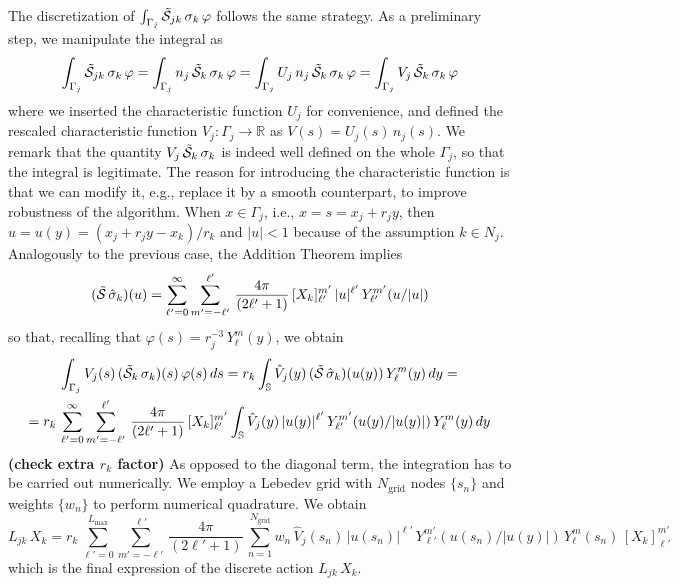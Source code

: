 The discretization of $\int_{\Gamma_j} \tilde{\mathcal{S}}_{jk} \, \sigma_k \, \varphi $ follows the same strategy. As a preliminary step, we manipulate the integral as
\[
\int_{\Gamma_j} \tilde{\mathcal{S}}_{jk} \, \sigma_k \, \varphi =\int_{\Gamma_j} n_j \, \tilde{\mathcal{S}}_{k} \, \sigma_k \, \varphi = \int_{\Gamma_j} U_j \,n_j \, \tilde{\mathcal{S}}_{k} \, \sigma_k \, \varphi = \int_{\Gamma_j} V_j \, \tilde{\mathcal{S}}_{k} \, \sigma_k \, \varphi
\]
where we inserted the characteristic function $U_j$ for convenience, and defined the rescaled characteristic function $V_j : \Gamma_j \to \mathbb{R}$ as $V(s) = U_j(s) \, n_j(s)$. We remark that the quantity $V_j \, \tilde{\mathcal{S}}_{k} \, \sigma_k $ is indeed well defined on the whole $\Gamma_j$, so that the integral is legitimate. The reason for introducing the characteristic function is that we can modify it, e.g., replace it by a smooth counterpart, to improve robustness of the algorithm. When $x \in \Gamma_j$, i.e., $x = s = x_j + r_j y$, then $u = u(y) = (x_j + r_j y -x_k)/r_k$ and $|u| < 1$ because of the assumption $k \in N_j$. Analogously to the previous case, the Addition Theorem implies
\[
(\tilde{\mathcal{S}} \, \hat{\sigma}_k)(u) = \sum_{\ell'= 0}^{\infty} \sum_{m' = -\ell'}^{\ell'} \, \frac{4\pi}{(2\ell' + 1)}\, [X_k]_{\ell'}^{m'} \, |u|^{\ell'} \, Y_{\ell'}^{m'}(u/|u|)
\]
so that, recalling that $\varphi(s) = r_j^{-3} \, Y_{\ell}^{m}(y)$, we obtain
\begin{multline*}
\int_{\Gamma_j} V_j(s) \, (\tilde{\mathcal{S}}_{k} \, \sigma_k)(s) \, \varphi(s) \, ds =  r_k \int_\mathbb{S} \hat{V}_j(y) \, (\tilde{\mathcal{S}} \, \hat{\sigma}_k)(u(y)) \, Y_\ell^m(y) \, dy = \\
= r_k \, \sum_{\ell'= 0}^{\infty} \sum_{m' = -\ell'}^{\ell'} \, \frac{4\pi}{(2\ell' + 1)}\, [X_k]_{\ell'}^{m'} \int_\mathbb{S} \hat{V}_j(y) \, |u(y)|^{\ell'} \, Y_{\ell'}^{m'}(u(y)/|u(y)|) \, Y_\ell^m(y) \, dy
\end{multline*}
{\bf (check extra $r_k$ factor)} As opposed to the diagonal term, the integration has to be carried out numerically. We employ a Lebedev grid with $N_\text{grid}$ nodes $\{s_n\}$ and weights $\{ w_n \}$ to perform numerical quadrature. We obtain
\[
L_{jk} \, X_k = r_k \, \sum_{\ell'= 0}^{L_\text{max}}  \sum_{m' = -\ell'}^{\ell'} \, \frac{4\pi}{(2\ell' + 1)}\, \sum_{n = 1}^{N_\text{grid}} w_n \, \hat{V}_j(s_n) \, |u(s_n)|^{\ell'} \, Y_{\ell'}^{m'}(u(s_n)/|u(y)|) \, Y_\ell^m(s_n)\, [X_k]_{\ell'}^{m'}  
\]
which is the final expression of the discrete action $L_{jk} \, X_k$.

